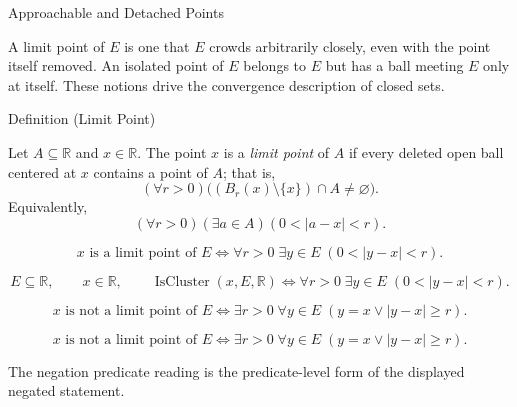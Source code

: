 \label{sec:limit-and-isolated-points}

\begin{topicbox}{Approachable and Detached Points}
\begin{exposition}
A limit point of $E$ is one that $E$ crowds arbitrarily closely, even with the point itself removed. An isolated point of $E$ belongs to $E$ but has a ball meeting $E$ only at itself. These notions drive the convergence description of closed sets.
\end{exposition}
\end{topicbox}
\begin{definitionbox}{Definition (Limit Point)}
\begin{definition}
\label{def:limit-point}
Let $A\subseteq\mathbb{R}$ and $x\in\mathbb{R}$.  The point $x$ is a
\emph{limit point} of $A$ if every deleted open ball centered at $x$ contains
a point of $A$; that is,
\[
  (\forall r>0)\bigl((B_r(x)\setminus\{x\})\cap A\neq\varnothing\bigr).
\]
Equivalently,
\[
  (\forall r>0)(\exists a\in A)(0<|a-x|<r).
\]
\end{definition}
\end{definitionbox}
\begin{remark*}
\[
x \text{ is a limit point of } E \Longleftrightarrow \forall r>0\;\exists y\in E\;(0<|y-x|<r).
\]
\end{remark*}

\begin{remark*}
\[
E\subseteq\mathbb{R},\qquad x\in\mathbb{R},\qquad
\operatorname{IsCluster}(x,E,\mathbb{R})
\Longleftrightarrow
\forall r>0\;\exists y\in E\;(0<|y-x|<r).
\]
\end{remark*}
\begin{remark*}
\[
x \text{ is not a limit point of } E \Longleftrightarrow \exists r>0\;\forall y\in E\;(y=x \lor |y-x|\geq r).
\]
\end{remark*}

\begin{remark*}
\[
x \text{ is not a limit point of } E \Longleftrightarrow \exists r>0\;\forall y\in E\;(y=x \lor |y-x|\geq r).
\]

The negation predicate reading is the predicate-level form of the displayed negated statement.
\end{remark*}

